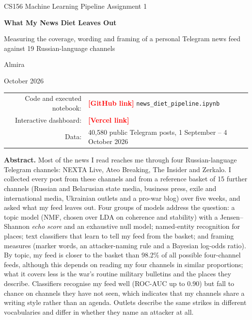 \documentclass[11pt,a4paper]{article}
\newcommand{\todo}[1]{\textcolor{red}{\textbf{[#1]}}}
\begin{document}
\begin{titlepage}
\centering
\vspace*{2.5cm}
{\sffamily\small CS156 Machine Learning \textperiodcentered{} Pipeline Assignment 1\par}
\vspace{0.8cm}
{\sffamily\bfseries\Huge What My News Diet Leaves Out\par}
\vspace{0.4cm}
{\sffamily\Large Measuring the coverage, wording and framing of a personal Telegram news feed against 19 Russian-language channels\par}
\vspace{1.4cm}
{\large Almira\par}
\vspace{0.3cm}
{\normalsize October 2026\par}
\vspace{1.2cm}
\begin{tabular}{rl}
Code and executed notebook: & \todo{GitHub link} \texttt{news\_diet\_pipeline.ipynb}\\
Interactive dashboard: & \todo{Vercel link}\\
Data: & 40,580 public Telegram posts, 1 September -- 4 October 2026\\
\end{tabular}
\vfill
\begin{minipage}{0.86\textwidth}
\small
\textbf{Abstract.} Most of the news I read reaches me through four Russian-language Telegram channels: NEXTA Live, Ateo Breaking, The Insider and Zerkalo. I collected every post from these channels and from a reference basket of 15 further channels (Russian and Belarusian state media, business press, exile and international media, Ukrainian outlets and a pro-war blog) over five weeks, and asked what my feed leaves out. Four groups of models address the question: a topic model (NMF, chosen over LDA on coherence and stability) with a Jensen--Shannon \emph{echo score} and an exhaustive null model; named-entity recognition for places; text classifiers that learn to tell my feed from the basket; and framing measures (marker words, an attacker-naming rule and a Bayesian log-odds ratio). By topic, my feed is closer to the basket than 98.2\% of all possible four-channel feeds, although this depends on reading my four channels in similar proportions; what it covers less is the war's routine military bulletins and the places they describe. Classifiers recognise my feed well (ROC-AUC up to 0.90) but fall to chance on channels they have not seen, which indicates that my channels share a writing style rather than an agenda. Outlets describe the same strikes in different vocabularies and differ in whether they name an attacker at all.
\end{minipage}
\vspace{1cm}
\end{titlepage}
\end{document}

